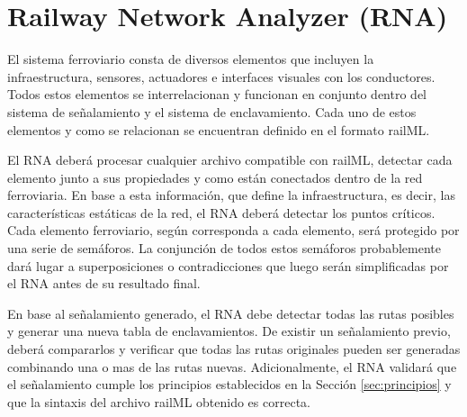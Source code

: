 \chapter{Railway Network Analyzer (RNA)}
    \label{sec:RNA}

    El sistema ferroviario consta de diversos elementos que incluyen la infraestructura, sensores, actuadores  e interfaces visuales con los conductores. Todos estos elementos se interrelacionan y funcionan en conjunto dentro del sistema de señalamiento y el sistema de enclavamiento. Cada uno de estos elementos y como se relacionan se encuentran definido en el formato railML. 

    El RNA deberá procesar cualquier archivo compatible con railML, detectar cada elemento junto a sus propiedades y como están conectados dentro de la red ferroviaria. En base a esta información, que define la infraestructura, es decir, las características estáticas de la red, el RNA deberá detectar los puntos críticos. Cada elemento ferroviario, según corresponda a cada elemento, será protegido por una serie de semáforos. La conjunción de todos estos semáforos probablemente dará lugar a superposiciones o contradicciones que luego serán simplificadas por el RNA antes de su resultado final.

    En base al señalamiento generado, el RNA debe detectar todas las rutas posibles y generar una nueva tabla de enclavamientos. De existir un señalamiento previo, deberá compararlos y verificar que todas las rutas originales pueden ser generadas combinando una o mas de las rutas nuevas. Adicionalmente, el RNA validará que el señalamiento cumple los principios establecidos en la Sección \ref{sec:principios} y que la sintaxis del archivo railML obtenido es correcta.    

    
    
    
    
    
    
    